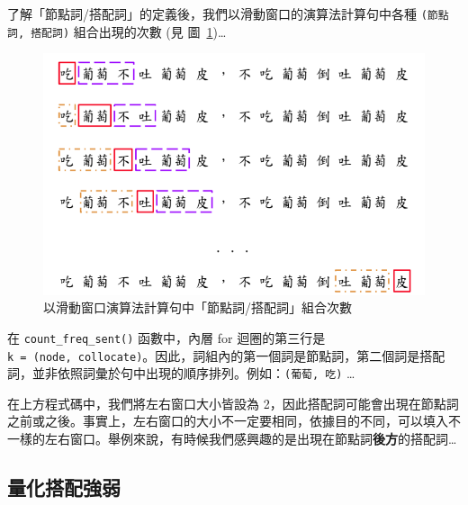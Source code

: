 了解「節點詞/搭配詞」的定義後，我們以滑動窗口的演算法計算句中各種
\texttt{(節點詞,\ 搭配詞)} 組合出現的次數 (見
圖~\ref{fig:ch07-sliding-window})\ldots{}

\begin{figure}
\hypertarget{fig:ch07-sliding-window}{%
\centering
\includegraphics{figures/ch07_collocation_sliding_window.png}
\caption{以滑動窗口演算法計算句中「節點詞/搭配詞」組合次數}\label{fig:ch07-sliding-window}
}
\end{figure}

\begin{Shaded}
\begin{Highlighting}[]
\OperatorTok{=}\NormalTok{ \{\} }
\OperatorTok{=} 
\end{Highlighting}
\end{Shaded}

在 \texttt{count\_freq\_sent()} 函數中，內層 for 迴圈的第三行是
\texttt{k\ =\ (node,\ collocate)}。因此，詞組內的第一個詞是節點詞，第二個詞是搭配詞，並非依照詞彙於句中出現的順序排列。例如：\texttt{(\textquotesingle{}葡萄\textquotesingle{},\ \textquotesingle{}吃\textquotesingle{})}
\ldots{}

在上方程式碼中，我們將左右窗口大小皆設為
2，因此搭配詞可能會出現在節點詞之前或之後。事實上，左右窗口的大小不一定要相同，依據目的不同，可以填入不一樣的左右窗口。舉例來說，有時候我們感興趣的是出現在節點詞\textbf{後方}的搭配詞\ldots{}

\hypertarget{ux91cfux5316ux642dux914dux5f37ux5f31}{%
\subsection{量化搭配強弱}\label{ux91cfux5316ux642dux914dux5f37ux5f31}}


